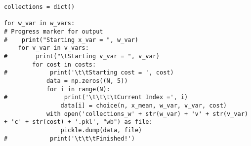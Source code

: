 \documentclass[12pt]{article}
\begin{document}
\begin{lstlisting}
collections = dict()

for w_var in w_vars:
# Progress marker for output
#    print("Starting x_var = ", w_var)
    for v_var in v_vars:
#        print("\tStarting v_var = ", v_var)
        for cost in costs:
#            print('\t\tStarting cost = ', cost)
            data = np.zeros((N, 5))
            for i in range(N):
#                print('\t\t\t\tCurrent Index =', i)
                data[i] = choice(n, x_mean, w_var, v_var, cost)
            with open('collections_w' + str(w_var) + 'v' + str(v_var) + 'c' + str(cost) + '.pkl', "wb") as file:
                pickle.dump(data, file)
#            print('\t\t\tFinished!')
\end{lstlisting}

\section{}
\end{document}
